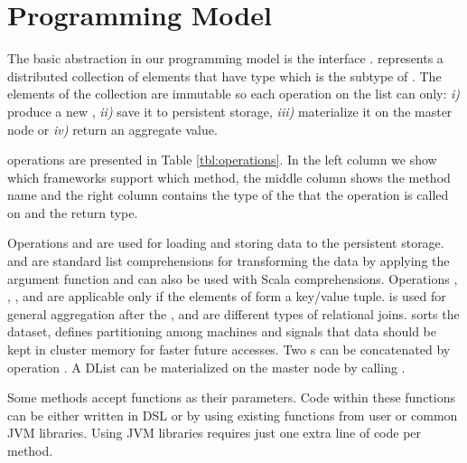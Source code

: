 \section{Programming Model}
\label{sec:programming-model}

The basic abstraction in our programming model is the interface .  represents a distributed collection of elements that have type  which is the subtype of . The elements of the  collection are immutable so each operation on the list can only: \emph{i)} produce a new , \emph{ii)} save it to persistent storage, \emph{iii)} materialize it on the master node or \emph{iv)} return an aggregate value. 

 operations are presented in Table \ref{tbl:operations}. In the left column we show which frameworks support which method, the middle column shows the method name and the right column contains the type of the  that the operation is called on and the return type. 

Operations  and  are used for loading and storing data to the persistent storage.  and  are standard list comprehensions for transforming the data by applying the argument function and can also be used with Scala  comprehensions. Operations , , ,  and  are applicable only if the elements of  form a key/value tuple.  is used for general aggregation after the ,  and  are different types of relational joins.  sorts the dataset,  defines partitioning among machines and  signals that data should be kept in cluster memory for faster future accesses. Two s can be concatenated by operation \code{++}. A DList can be materialized on the master node by calling .

Some methods accept functions as their parameters. Code within these functions can be either written in \tool DSL or by using existing functions from user or common JVM libraries. Using JVM libraries requires just one extra line of code per method.  

